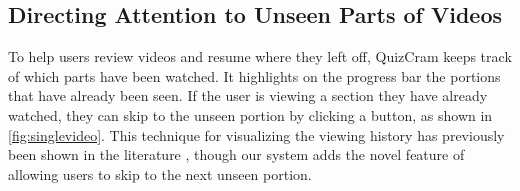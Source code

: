 \documentclass{sigchi}
\begin{document}


\subsection{Directing Attention to Unseen Parts of Videos}

To help users review videos and resume where they left off, QuizCram keeps track of which parts have been watched. It highlights on the progress bar the portions that have already been seen. If the user is viewing a section they have already watched, they can skip to the unseen portion by clicking a button, as shown in \autoref{fig:singlevideo}. This technique for visualizing the viewing history has previously been shown in the literature \cite{socialnavigation} \cite{lecturescape}, though our system adds the novel feature of allowing users to skip to the next unseen portion. %
\end{document}
